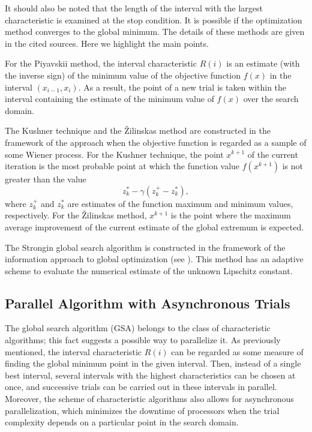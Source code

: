 \documentclass{svproc}
\begin{document}
It should also be noted that the length of the interval with the largest characteristic is examined at the stop condition.
It is possible if the optimization method converges to the global minimum.
The details of these methods are given in the cited sources.
Here we highlight the main points.

For the Piyavskii method, the interval characteristic $R(i)$ is an estimate (with the inverse sign) of the minimum value of the objective function $f(x)$ in the interval $(x_{i-1},x_i)$. As a result, the point of a new trial is taken within the interval containing the estimate of the minimum value of $f(x)$ over the search domain.

The Kushner technique and the \v{Z}ilinskas method are constructed in the framework of the approach when the objective function is regarded as
a sample of some Wiener process. For the Kushner technique, the point $x^{k+1}$ of the current iteration is the most probable point at which the function value
$f(x^{k+1})$ is not greater than the value
\[
z_k^* -\gamma (z_k^+-z_k^*),
\]
where $z_k^+$ and $z_k^*$ are estimates of the function maximum and minimum values, respectively. For the \v{Z}ilinskas method, $x^{k+1}$ is the point where the maximum average improvement of the current estimate of the global extremum is expected.

The Strongin global search algorithm is constructed in the framework of the information approach to global optimization (see \cite{Strongin2000}). This method has an adaptive scheme to evaluate the numerical estimate of the unknown Lipschitz constant.

\subsection{Parallel Algorithm with Asynchronous Trials}\label{Sec_PGSA}

The global search algorithm (GSA) belongs to the class of characteristic algorithms; this fact suggests a possible way to parallelize it.
As previously mentioned, the interval characteristic $R(i)$ can be regarded as some measure of finding the global minimum point in the given interval. Then, instead of a single best interval, several intervals with the highest characteristics can be chosen at once, and successive trials can be carried out in these intervals in parallel. Moreover, the scheme of characteristic algorithms also allows for asynchronous parallelization, which minimizes the downtime of processors when the trial complexity depends on a particular point in the search domain.
\end{document}
